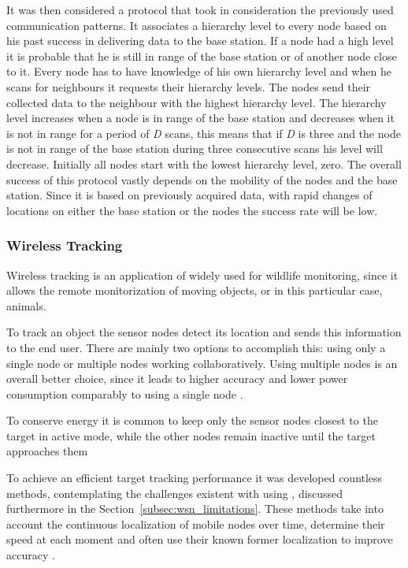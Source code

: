 It was then considered a protocol that took in consideration the previously used communication
patterns. It associates a hierarchy level to every node based on his past success in delivering
data to the base station. If a node had a high level it is probable that he is still in range
of the base station or of another node close to it. Every node has to have knowledge of his
own hierarchy level and when he scans for neighbours it requests their hierarchy levels. The
nodes send their collected data to the neighbour with the highest hierarchy level. The hierarchy
level increases when a node is in range of the base station and decreases when it is not in
range for a period of \textit{D} scans, this means that if \textit{D} is three and the node is
not in range of the base station during three consecutive scans his level will decrease.
Initially all nodes start with the lowest hierarchy level, zero. The overall success of this
protocol vastly depends on the mobility of the nodes and the base station. Since it is based
on previously acquired data, with rapid changes of locations on either the base station or
the nodes the success rate will be low.


\subsubsection{Wireless Tracking}
\label{subsubsection:wireless_tracking}
Wireless tracking is an application of  widely used for wildlife monitoring,
since it allows the remote monitorization of moving objects, or in this particular case,
animals.

To track an object the sensor nodes detect its location and sends this information to the end
user. There are mainly two options to accomplish this: using only a single node or multiple
nodes working collaboratively. Using multiple nodes is an overall better choice, since it leads
to higher accuracy and lower power consumption comparably to using a single node \cite{Ez2016}.

To conserve energy it is common to keep only the sensor nodes closest to the target in active
mode, while the other nodes remain inactive until the target approaches them

To achieve an efficient target tracking performance it was developed countless methods,
contemplating the challenges existent with using , discussed furthermore in
the Section~\ref{subsec:wsn_limitations}. These methods take into account the continuous
localization of mobile nodes over time, determine their speed at each moment and often use
their known former localization to improve accuracy \cite{Kumar2017}.

